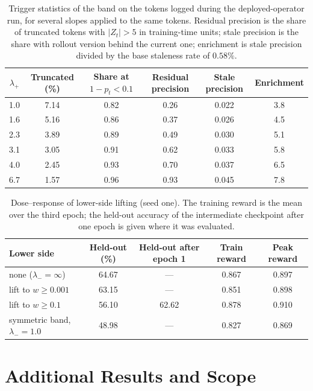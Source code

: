 \begin{table}[h]
\centering
\caption{Trigger statistics of the band on the tokens logged during the deployed-operator run, for several slopes applied to the same tokens. Residual precision is the share of truncated tokens with $|Z_t|>5$ in training-time units; stale precision is the share with rollout version behind the current one; enrichment is stale precision divided by the base staleness rate of $0.58\%$.}
\label{tab:trigger}
\small
\begin{tabular}{cccccc}
\toprule
$\lambda_+$ & Truncated (\%) & Share at $1-p_t<0.1$ & Residual precision & Stale precision & Enrichment \\
\midrule
1.0 & 7.14 & 0.82 & 0.26 & 0.022 & 3.8 \\
1.6 & 5.16 & 0.86 & 0.37 & 0.026 & 4.5 \\
2.3 & 3.89 & 0.89 & 0.49 & 0.030 & 5.1 \\
3.1 & 3.05 & 0.91 & 0.62 & 0.033 & 5.8 \\
4.0 & 2.45 & 0.93 & 0.70 & 0.037 & 6.5 \\
6.7 & 1.57 & 0.96 & 0.93 & 0.045 & 7.8 \\
\bottomrule
\end{tabular}
\end{table}

\begin{table}[h]
\centering
\caption{Dose--response of lower-side lifting (seed one). The training reward is the mean over the third epoch; the held-out accuracy of the intermediate checkpoint after one epoch is given where it was evaluated.}
\label{tab:dose}
\small
\begin{tabular}{lcccc}
\toprule
Lower side & Held-out (\%) & Held-out after epoch 1 & Train reward & Peak reward \\
\midrule
none ($\lambda_-=\infty$) & 64.67 & --- & 0.867 & 0.897 \\
lift to $w\ge0.001$ & 63.15 & --- & 0.851 & 0.898 \\
lift to $w\ge0.1$ & 56.10 & 62.62 & 0.878 & 0.910 \\
symmetric band, $\lambda_-=1.0$ & 48.98 & --- & 0.827 & 0.869 \\
\bottomrule
\end{tabular}
\end{table}

\section{Additional Results and Scope}
\label{app:discussion}

